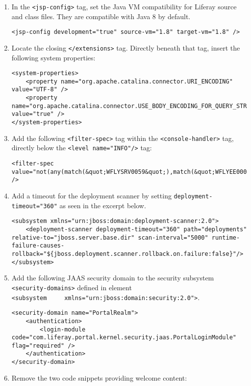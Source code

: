 \begin{enumerate}
\def\labelenumi{\arabic{enumi}.}
\item
  In the \texttt{\textless{}jsp-config\textgreater{}} tag, set the Java
  VM compatibility for Liferay source and class files. They are
  compatible with Java 8 by default.

\begin{verbatim}
<jsp-config development="true" source-vm="1.8" target-vm="1.8" />
\end{verbatim}
\item
  Locate the closing \texttt{\textless{}/extensions\textgreater{}} tag.
  Directly beneath that tag, insert the following system properties:

\begin{verbatim}
<system-properties>
    <property name="org.apache.catalina.connector.URI_ENCODING" value="UTF-8" />
    <property name="org.apache.catalina.connector.USE_BODY_ENCODING_FOR_QUERY_STRING" value="true" />
</system-properties>
\end{verbatim}
\item
  Add the following \texttt{\textless{}filter-spec\textgreater{}} tag
  within the \texttt{\textless{}console-handler\textgreater{}} tag,
  directly below the
  \texttt{\textless{}level\ name="INFO"/\textgreater{}} tag:

\begin{verbatim}
<filter-spec value="not(any(match(&quot;WFLYSRV0059&quot;),match(&quot;WFLYEE0007&quot;)))" />
\end{verbatim}
\item
  Add a timeout for the deployment scanner by setting
  \texttt{deployment-timeout="360"} as seen in the excerpt below.

\begin{verbatim}
<subsystem xmlns="urn:jboss:domain:deployment-scanner:2.0">
    <deployment-scanner deployment-timeout="360" path="deployments" relative-to="jboss.server.base.dir" scan-interval="5000" runtime-failure-causes-rollback="${jboss.deployment.scanner.rollback.on.failure:false}"/>
</subsystem>
\end{verbatim}
\item
  Add the following JAAS security domain to the security subsystem
  \texttt{\textless{}security-domains\textgreater{}} defined in element
  \texttt{\textless{}subsystem\ \ \ \ \ xmlns="urn:jboss:domain:security:2.0"\textgreater{}}.

\begin{verbatim}
<security-domain name="PortalRealm">
    <authentication>
        <login-module code="com.liferay.portal.kernel.security.jaas.PortalLoginModule" flag="required" />
    </authentication>
</security-domain>
\end{verbatim}
\item
  Remove the two code snippets providing welcome content:


\end{enumerate}
